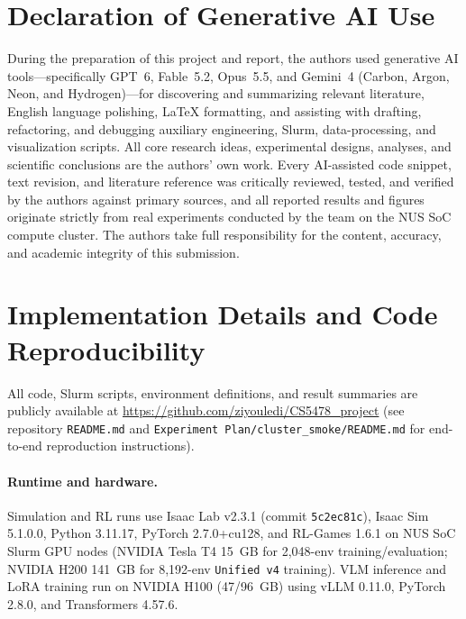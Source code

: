 \section{Declaration of Generative AI Use}
\label{app:ai_declaration}
During the preparation of this project and report, the authors used generative AI tools---specifically GPT~6, Fable~5.2, Opus~5.5, and Gemini~4 (Carbon, Argon, Neon, and Hydrogen)---for discovering and summarizing relevant literature, English language polishing, LaTeX formatting, and assisting with drafting, refactoring, and debugging auxiliary engineering, Slurm, data-processing, and visualization scripts. All core research ideas, experimental designs, analyses, and scientific conclusions are the authors' own work. Every AI-assisted code snippet, text revision, and literature reference was critically reviewed, tested, and verified by the authors against primary sources, and all reported results and figures originate strictly from real experiments conducted by the team on the NUS SoC compute cluster. The authors take full responsibility for the content, accuracy, and academic integrity of this submission.

\section{Implementation Details and Code Reproducibility}
\label{app:impl}
All code, Slurm scripts, environment definitions, and result summaries are publicly available at \url{https://github.com/ziyouledi/CS5478_project} (see repository \texttt{README.md} and \texttt{Experiment Plan/cluster\_smoke/README.md} for end-to-end reproduction instructions).

\paragraph{Runtime and hardware.}
Simulation and RL runs use Isaac Lab v2.3.1 (commit \texttt{5c2ec81c}), Isaac Sim 5.1.0.0, Python 3.11.17, PyTorch 2.7.0+cu128, and RL-Games 1.6.1 on NUS SoC Slurm GPU nodes (NVIDIA Tesla T4 15~GB for 2,048-env training/evaluation; NVIDIA H200 141~GB for 8,192-env \texttt{Unified v4} training).
VLM inference and LoRA training run on NVIDIA H100 (47/96~GB) using vLLM 0.11.0, PyTorch 2.8.0, and Transformers 4.57.6.

